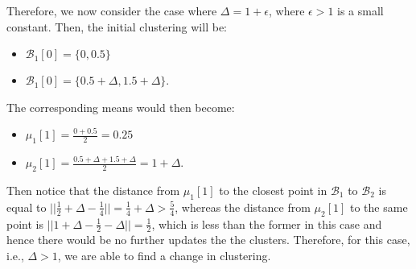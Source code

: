\documentclass{article}
\begin{document}
    Therefore, we now consider the case where $\Delta = 1+\epsilon$, where
    $\epsilon>1$ is a small constant. Then, the initial clustering will be:
    \begin{itemize}
        \item $\mathcal{B}_1[0] = \{0, 0.5\}$
        \item $\mathcal{B}_1[0] = \{0.5+\Delta, 1.5+\Delta\}$.
    \end{itemize}
    The corresponding means would then become:
    \begin{itemize}
        \item $\mu_1[1] = \frac{0+0.5}{2} = 0.25$
        \item $\mu_2[1] = \frac{0.5+\Delta+1.5+\Delta}{2} = 1+\Delta$.
    \end{itemize}
    Then notice that the distance from $\mu_1[1]$ to the closest point in 
    $\mathcal{B}_1$ to $\mathcal{B}_2$ is equal to $||\frac{1}{2}+\Delta-
    \frac{1}{4}|| = \frac{1}{4}+\Delta > \frac{5}{4}$, whereas the distance 
    from $\mu_2[1]$ to the same point is $||1+\Delta - \frac{1}{2}-\Delta|| = 
    \frac{1}{2}$, which is less than the former in this case and hence
    there would be no further updates the the clusters. Therefore, for this 
    case, i.e., $\Delta>1$, we are able to find a change in clustering.
\end{document}
